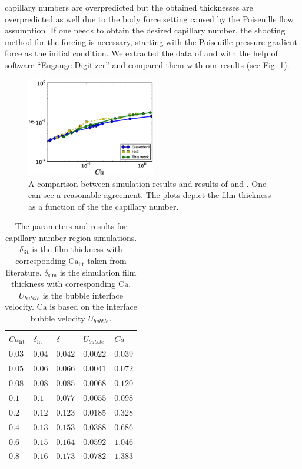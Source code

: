 \documentclass{CFD2011}
\newcommand{\Ca}{\mathrm{Ca}}
\begin{document}
capillary numbers are overpredicted but the obtained thicknesses are overpredicted
as well due to the body force setting caused by the Poiseuille flow assumption. If one
needs to obtain the desired capillary number, the shooting method for the forcing is
necessary, starting with the Poiseuille pressure gradient force as the initial condition. We
extracted
the data of 
\citet{giavedoni-numerical} and \citet{heil-bretherton} with the help of software ``Engauge
Digitizer'' and compared them with our results (see 
Fig. \ref{fig:capillary:comparison}).
\begin{figure}
\includegraphics[width=0.5\textwidth]{Figures/capillaries_comparison.eps}
\caption{A comparison between simulation results and results of
\citet{giavedoni-numerical} and \citet{heil-bretherton}. One can see a
reasonable agreement. The plots depict the film thickness as a function of the
the capillary number.\label{fig:capillary:comparison}}
\end{figure}

\begin{table}
\begin{tabularx}{0.5\textwidth}{|X|X|X|X|X|}
\hline
$Ca_{\mathrm{lit}}$&$\delta_{\mathrm{lit}}$&$\delta$&$U_{bubble}$&$Ca$\\
\hline
$0.03$&$0.04$&$0.042$&$0.0022$&$0.039$\\
\hline
$0.05$&$0.06$&$0.066$&$0.0041$&$0.072$\\
\hline
$0.08$&$0.08$&$0.085$&$0.0068$&$0.120$\\
\hline
$0.1$&$0.1$&$0.077$&$0.0055$&$0.098$\\
\hline
$0.2$&$0.12$&$0.123$&$0.0185$&$0.328$\\
\hline
$0.4$&$0.13$&$0.153$&$0.0388$&$0.686$\\
\hline
$0.6$&$0.15$&$0.164$&$0.0592$&$1.046$\\
\hline
$0.8$&$0.16$&$0.173$&$0.0782$&$1.383$\\
\hline
\end{tabularx}
\caption{The parameters and results for capillary number region simulations.
$\delta_{\mathrm{lit}}$ is the film thickness with corresponding $\Ca_{\mathrm{lit}}$ taken from
literature. $\delta_{\mathrm{sim}}$ is the simulation film thickness with corresponding $\Ca$.
$U_{bubble}$ is the bubble interface velocity. $\Ca$ is based on the interface bubble velocity
$U_{bubble}$.
\label{table:parameters:capillary:number}}
\end{table}
\end{document}
